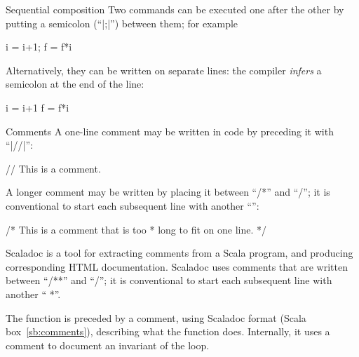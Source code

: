 
\begin{scalaBox}{Sequential composition}
\label{sb:seq-comp}
Two commands can be executed one after the other by putting a semicolon
(``|;|'') between them; for example
\begin{scala}
  i = i+1; f = f*i
\end{scala}
Alternatively, they can be written on separate lines: the compiler
\emph{infers} a semicolon at the end of the line:
\begin{scala}
  i = i+1
  f = f*i
\end{scala}
\end{scalaBox}

 


\begin{scalaBox}{Comments}
\label{sb:comments}
A one-line comment may be written in code by preceding it with ``|//|'':
\begin{scala}
  // This is a comment.
\end{scala}

A longer comment may be written
by placing it between ``{\scalastyle\rm /*}'' and ``{\scalastyle\rm */}''; it is
conventional to start each subsequent line with another 
``{\scalastyle\rm *}'':
\begin{scala}
  /* This is a comment that is too
   * long to fit on one line. */
\end{scala}

Scaladoc is a tool for extracting comments from a Scala program, and producing
corresponding HTML documentation.  Scaladoc uses comments that are written
between ``{\scalastyle\rm /**}'' and ``{\scalastyle\rm */}''; it is
conventional to start each subsequent line with another ``{\scalastyle\rm
  *}''.
%
\end{scalaBox}


\bigskip

\pagebreak[3]

The function is preceded by a comment, using Scaladoc format (Scala
box~\ref{sb:comments}), describing what the function does.  Internally, it
uses a comment to document an invariant of the loop.

